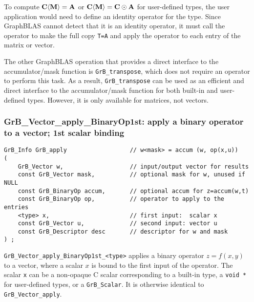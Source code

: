 \documentclass[12pt]{article}
\begin{document}
{To compute ${\bf C \langle M \rangle = A}$ or ${\bf C \langle M \rangle = C
\odot A}$ for user-defined types, the user application would need to define an
identity operator for the type.  Since GraphBLAS cannot detect that it is an
identity operator, it must call the operator to make the full copy \verb'T=A'
and apply the operator to each entry of the matrix or vector.

The other GraphBLAS operation that provides a direct interface to the
accumulator/mask function is \verb'GrB_transpose', which does not require an
operator to perform this task.  As a result, \verb'GrB_transpose' can be used
as an efficient and direct interface to the accumulator/mask function for
both built-in and user-defined types.  However, it is only available for
matrices, not vectors.

\newpage
\subsubsection{{\sf GrB\_Vector\_apply\_BinaryOp1st:} apply a binary operator to a vector; 1st scalar binding}
\label{vector_apply1st}

\begin{mdframed}[userdefinedwidth=6in]
{\footnotesize
\begin{verbatim}
GrB_Info GrB_apply                  // w<mask> = accum (w, op(x,u))
(
    GrB_Vector w,                   // input/output vector for results
    const GrB_Vector mask,          // optional mask for w, unused if NULL
    const GrB_BinaryOp accum,       // optional accum for z=accum(w,t)
    const GrB_BinaryOp op,          // operator to apply to the entries
    <type> x,                       // first input:  scalar x
    const GrB_Vector u,             // second input: vector u
    const GrB_Descriptor desc       // descriptor for w and mask
) ;
\end{verbatim} } \end{mdframed}

\verb'GrB_Vector_apply_BinaryOp1st_<type>'  applies a binary operator
$z=f(x,y)$ to a vector, where a scalar $x$ is bound to the first input of the
operator.
The scalar \verb'x' can be a non-opaque C scalar corresponding to a built-in
type, a \verb'void *' for user-defined types, or a \verb'GrB_Scalar'.
It is otherwise identical to \verb'GrB_Vector_apply'.

}
\end{document}
